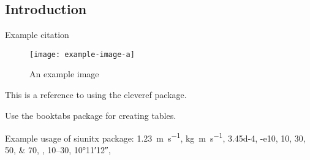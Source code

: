 \subsection*{Introduction}

Example citation \cite{Nobody06}

\begin{figure}[h]
\centering
\texttt{[image: example-image-a]}
\caption{An example image}
\label{fig:example}
\end{figure}

This is a reference to  using the cleveref package.

Use the booktabs package for creating tables.

Example usage of siunitx package: \SI{1.23}{\meter\per\second}, \unit{kg.m.s^{-1}}, \num{3.45d-4}, \num{-e10}, \numlist{10;30;50;70}, , \numrange{10}{30}, \ang{10;11;12},